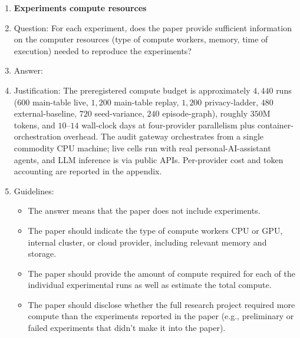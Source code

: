 \begin{enumerate}
\item {\bf Experiments compute resources}
    \item[] Question: For each experiment, does the paper provide sufficient information on the computer resources (type of compute workers, memory, time of execution) needed to reproduce the experiments?
    \item[] Answer: \answerYes{}
    \item[] Justification: The preregistered compute budget is approximately $4{,}440$ runs ($600$ main-table live, $1{,}200$ main-table replay, $1{,}200$ privacy-ladder, $480$ external-baseline, $720$ seed-variance, $240$ episode-graph), roughly $350$M tokens, and $10$--$14$ wall-clock days at four-provider parallelism plus container-orchestration overhead. The audit gateway orchestrates from a single commodity CPU machine; live cells run with real personal-AI-assistant agents, and LLM inference is via public APIs. Per-provider cost and token accounting are reported in the appendix.
    \item[] Guidelines:
    \begin{itemize}
        \item The answer \answerNA{} means that the paper does not include experiments.
        \item The paper should indicate the type of compute workers CPU or GPU, internal cluster, or cloud provider, including relevant memory and storage.
        \item The paper should provide the amount of compute required for each of the individual experimental runs as well as estimate the total compute.
        \item The paper should disclose whether the full research project required more compute than the experiments reported in the paper (e.g., preliminary or failed experiments that didn't make it into the paper).
    \end{itemize}


\end{enumerate}
